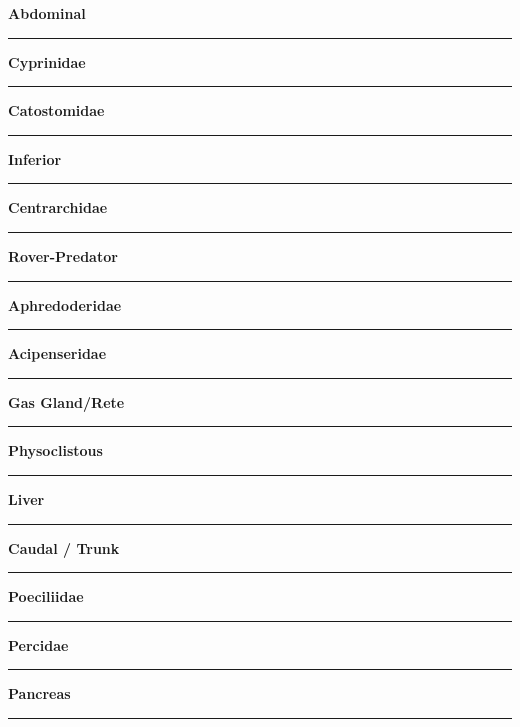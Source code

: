 \documentclass[11pt]{exam}
\newcommand*\Matching[1]{
\ifprintanswers
	\textbf{#1}
\else
	\rule{2.1in}{0.4pt}
\fi
}
\newlength\matchlena
\newlength\matchlenb
\newcommand\MatchQuestion[2]{%
	\setlength\matchlenb{\linewidth}
	\addtolength\matchlenb{-\matchlena}
	\parbox[t]{\matchlena}{\Matching{#1}}\enspace\parbox[t]{\matchlenb}{#2}}
\begin{document}
\begin{questions}
\begin{multicols}{2}
\question\MatchQuestion{Abdominal}{}
\vspace{2\baselineskip}

\question\MatchQuestion{Cyprinidae}{}
\vspace{2\baselineskip}

\question\MatchQuestion{Catostomidae}{}
\vspace{2\baselineskip}

\question\MatchQuestion{Inferior}{}
\vspace{2\baselineskip}

\question\MatchQuestion{Centrarchidae}{}
\vspace{2\baselineskip}

\question\MatchQuestion{Rover-Predator}{}
\vspace{2\baselineskip}

\question\MatchQuestion{Aphredoderidae}{}
\vspace{2\baselineskip}

\question\MatchQuestion{Acipenseridae}{}
\vspace{2\baselineskip}


\question\MatchQuestion{Gas Gland/Rete}{}
\vspace{2\baselineskip}

\question\MatchQuestion{Physoclistous}{}
\vspace{2\baselineskip}

\question\MatchQuestion{Liver}{}
\vspace{2\baselineskip}


\question\MatchQuestion{Caudal / Trunk}{}
\vspace{2\baselineskip}

%
%
\question\MatchQuestion{Poeciliidae}{}
\vspace{2\baselineskip}

\question\MatchQuestion{Percidae}{}
\vspace{2\baselineskip}

\question\MatchQuestion{Pancreas}{}
\vspace{2\baselineskip}


\end{multicols}
\end{questions}
\end{document}
